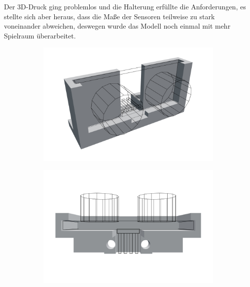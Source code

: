 \documentclass[a4paper, 12pt]{scrartcl}
\begin{document}
Der 3D-Druck ging problemlos und die Halterung erfüllte die Anforderungen, es stellte sich aber heraus, dass die Maße der Sensoren teilweise zu stark voneinander abweichen, deswegen wurde das Modell noch einmal mit mehr Spielraum überarbeitet.

\begin{figure}[H]
	\centering
	\begin{subfigure}{.375\textwidth}
		\centering
		\includegraphics[width=\textwidth]{../3D-Druck_Modelle/Sensorhalterung.png}
	\end{subfigure}%
	\begin{subfigure}{.375\textwidth}
		\centering
		\includegraphics[width=\textwidth]{../3D-Druck_Modelle/Sensorhalterung_Top.png}
	\end{subfigure}\\
	\begin{subfigure}{.375\textwidth}
		\centering

\end{subfigure}
\end{figure}
\end{document}
